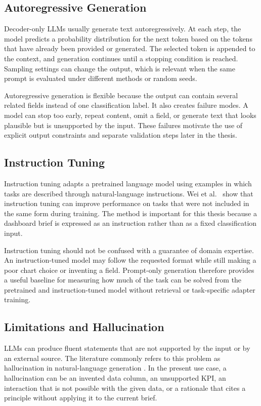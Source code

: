 \subsection{Autoregressive Generation}

Decoder-only LLMs usually generate text autoregressively. At each step, the model predicts a probability distribution for the next token based on the tokens that have already been provided or generated. The selected token is appended to the context, and generation continues until a stopping condition is reached. Sampling settings can change the output, which is relevant when the same prompt is evaluated under different methods or random seeds.

Autoregressive generation is flexible because the output can contain several related fields instead of one classification label. It also creates failure modes. A model can stop too early, repeat content, omit a field, or generate text that looks plausible but is unsupported by the input. These failures motivate the use of explicit output constraints and separate validation steps later in the thesis.

\subsection{Instruction Tuning}

Instruction tuning adapts a pretrained language model using examples in which tasks are described through natural-language instructions. Wei et al.~\cite{wei2022flan} show that instruction tuning can improve performance on tasks that were not included in the same form during training. The method is important for this thesis because a dashboard brief is expressed as an instruction rather than as a fixed classification input.

Instruction tuning should not be confused with a guarantee of domain expertise. An instruction-tuned model may follow the requested format while still making a poor chart choice or inventing a field. Prompt-only generation therefore provides a useful baseline for measuring how much of the task can be solved from the pretrained and instruction-tuned model without retrieval or task-specific adapter training.

\subsection{Limitations and Hallucination}

LLMs can produce fluent statements that are not supported by the input or by an external source. The literature commonly refers to this problem as hallucination in natural-language generation \cite{ji2023hallucination}. In the present use case, a hallucination can be an invented data column, an unsupported KPI, an interaction that is not possible with the given data, or a rationale that cites a principle without applying it to the current brief.

